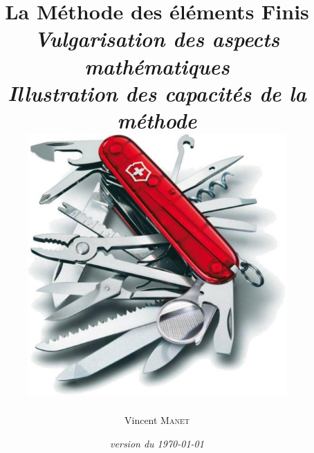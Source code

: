 \documentclass[11pt,pdflatex]{book}
\date{\emph{version du \today}}
\begin{document}
\ifVersionDuDocEstVincent
%
\title{\textbf{La Méthode des éléments Finis}\\[+5mm]
  \emph{ Vulgarisation des aspects mathématiques}\\
  \emph{ Illustration des capacités de la méthode}\\[+5mm]
  \includegraphics[height=100mm]{couteau-suisse}}
  \author{Vincent \textsc{Manet}}%
  \maketitle
\else
  \thispagestyle{empty}\mbox{}%
\end{document}
